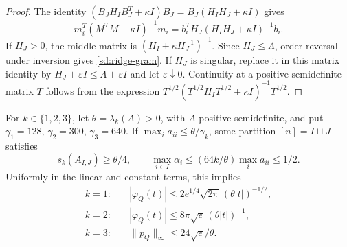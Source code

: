 \begin{proof}
The identity
$(B_JH_IB_J^T+\kappa I)B_J=B_J(H_IH_J+\kappa I)$ gives
\[
 m_i^T(M^TM+\kappa I)^{-1}m_i
 =b_i^TH_J(H_IH_J+\kappa I)^{-1}b_i .
\]
If $H_J>0$, the middle matrix is
$(H_I+\kappa H_J^{-1})^{-1}$.
Since $H_J\leq\Lambda$, order reversal under inversion gives
\eqref{sd:ridge-gram}.  If $H_J$ is singular, replace it in this
matrix identity by $H_J+\varepsilon I\leq\Lambda+\varepsilon I$
and let $\varepsilon\downarrow0$.
Continuity at a positive semidefinite matrix $T$ follows from the
expression
$T^{1/2}(T^{1/2}H_IT^{1/2}+\kappa I)^{-1}T^{1/2}$.
\end{proof}

\begin{proposition}\label{sd:psd-partition}
For $k\in\{1,2,3\}$, let $\theta=\lambda_k(A)>0$, with $A$
positive semidefinite, and put
$\gamma_1=128$, $\gamma_2=300$, $\gamma_3=640$.
If $\max_i a_{ii}\leq\theta/\gamma_k$, some partition
$[n]=I\sqcup J$ satisfies
\[
 s_k(A_{I,J})\geq\theta/4,\qquad
 \max_{i\in I}\alpha_i
 \leq(64k/\theta)\max_i a_{ii}\leq1/2.
\]
Uniformly in the linear and constant terms, this implies
\begin{align}
 k=1:\quad&
 |\varphi_Q(t)|\leq2e^{1/4}\sqrt{2\pi}\,
                         (\theta|t|)^{-1/2},\label{sd:psd-k1}\\
 k=2:\quad&
 |\varphi_Q(t)|\leq8\pi\sqrt e\,(\theta|t|)^{-1},
                         \label{sd:psd-k2}\\
 k=3:\quad&
 \|p_Q\|_\infty\leq24\sqrt e/\theta.\label{sd:psd-k3}
\end{align}
\end{proposition}

